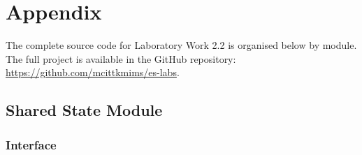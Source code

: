 \section{Appendix}

The complete source code for Laboratory Work 2.2 is organised below by module. The full project is available in the GitHub repository: \url{https://github.com/mcittkmims/es-labs}.

\subsection{Shared State Module}

\subsubsection{Interface}

